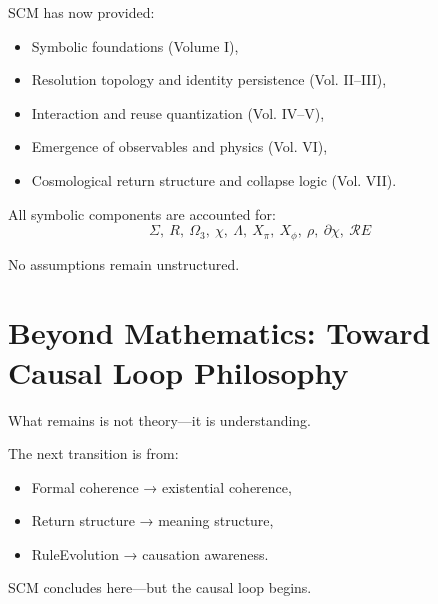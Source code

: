 SCM has now provided:
\begin{itemize}
  \item Symbolic foundations (Volume I),
  \item Resolution topology and identity persistence (Vol. II–III),
  \item Interaction and reuse quantization (Vol. IV–V),
  \item Emergence of observables and physics (Vol. VI),
  \item Cosmological return structure and collapse logic (Vol. VII).
\end{itemize}

All symbolic components are accounted for:
\[
\Sigma,\ R,\ \Omega_3,\ \chi,\ \Lambda,\ X_\pi,\ X_\phi,\ \rho,\ \partial\chi,\ \mathcal{R}E
\]

No assumptions remain unstructured.

\section{Beyond Mathematics: Toward Causal Loop Philosophy} \label{sec:beyond-math}

What remains is not theory—it is understanding.

The next transition is from:
\begin{itemize}
  \item Formal coherence → existential coherence,
  \item Return structure → meaning structure,
  \item RuleEvolution → causation awareness.
\end{itemize}

SCM concludes here—but the causal loop begins.

